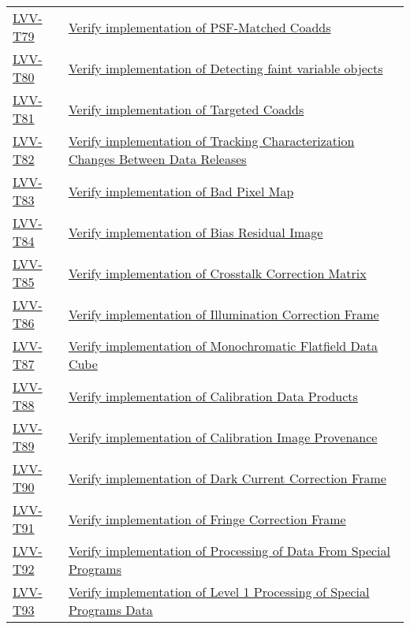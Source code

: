 \begin{longtable}[]{p{3cm}p{13cm}}
    \hyperref[lvv-t79]{LVV-T79} &
    \href{https://jira.lsstcorp.org/secure/Tests.jspa\#/testCase/LVV-T79}{Verify implementation of PSF-Matched Coadds} \tabularnewline
    \hyperref[lvv-t80]{LVV-T80} &
    \href{https://jira.lsstcorp.org/secure/Tests.jspa\#/testCase/LVV-T80}{Verify implementation of Detecting faint variable objects} \tabularnewline
    \hyperref[lvv-t81]{LVV-T81} &
    \href{https://jira.lsstcorp.org/secure/Tests.jspa\#/testCase/LVV-T81}{Verify implementation of Targeted Coadds} \tabularnewline
    \hyperref[lvv-t82]{LVV-T82} &
    \href{https://jira.lsstcorp.org/secure/Tests.jspa\#/testCase/LVV-T82}{Verify implementation of Tracking Characterization Changes Between Data Releases} \tabularnewline
    \hyperref[lvv-t83]{LVV-T83} &
    \href{https://jira.lsstcorp.org/secure/Tests.jspa\#/testCase/LVV-T83}{Verify implementation of Bad Pixel Map} \tabularnewline
    \hyperref[lvv-t84]{LVV-T84} &
    \href{https://jira.lsstcorp.org/secure/Tests.jspa\#/testCase/LVV-T84}{Verify implementation of Bias Residual Image} \tabularnewline
    \hyperref[lvv-t85]{LVV-T85} &
    \href{https://jira.lsstcorp.org/secure/Tests.jspa\#/testCase/LVV-T85}{Verify implementation of Crosstalk Correction Matrix} \tabularnewline
    \hyperref[lvv-t86]{LVV-T86} &
    \href{https://jira.lsstcorp.org/secure/Tests.jspa\#/testCase/LVV-T86}{Verify implementation of Illumination Correction Frame} \tabularnewline
    \hyperref[lvv-t87]{LVV-T87} &
    \href{https://jira.lsstcorp.org/secure/Tests.jspa\#/testCase/LVV-T87}{Verify implementation of Monochromatic Flatfield Data Cube} \tabularnewline
    \hyperref[lvv-t88]{LVV-T88} &
    \href{https://jira.lsstcorp.org/secure/Tests.jspa\#/testCase/LVV-T88}{Verify implementation of Calibration Data Products} \tabularnewline
    \hyperref[lvv-t89]{LVV-T89} &
    \href{https://jira.lsstcorp.org/secure/Tests.jspa\#/testCase/LVV-T89}{Verify implementation of Calibration Image Provenance} \tabularnewline
    \hyperref[lvv-t90]{LVV-T90} &
    \href{https://jira.lsstcorp.org/secure/Tests.jspa\#/testCase/LVV-T90}{Verify implementation of Dark Current Correction Frame} \tabularnewline
    \hyperref[lvv-t91]{LVV-T91} &
    \href{https://jira.lsstcorp.org/secure/Tests.jspa\#/testCase/LVV-T91}{Verify implementation of Fringe Correction Frame} \tabularnewline
    \hyperref[lvv-t92]{LVV-T92} &
    \href{https://jira.lsstcorp.org/secure/Tests.jspa\#/testCase/LVV-T92}{Verify implementation of Processing of Data From Special Programs} \tabularnewline
    \hyperref[lvv-t93]{LVV-T93} &
    \href{https://jira.lsstcorp.org/secure/Tests.jspa\#/testCase/LVV-T93}{Verify implementation of Level 1 Processing of Special Programs Data} \tabularnewline

\end{longtable}
